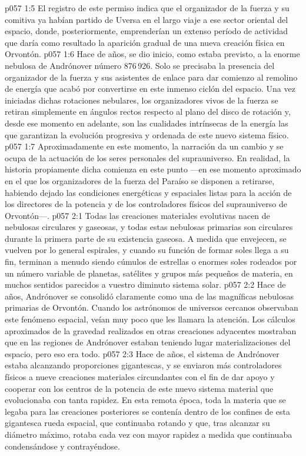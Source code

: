 \vs p057 1:5 El registro de este permiso indica que el organizador de la fuerza y su comitiva ya habían partido de Uversa en el largo viaje a ese sector oriental del espacio, donde, posteriormente, emprenderían un extenso período de actividad que daría como resultado la aparición gradual de una nueva creación física en Orvontón.
\vs p057 1:6 \pc Hace  de años, se dio inicio, como estaba previsto, a la enorme nebulosa de Andrónover número 876\,926. Solo se precisaba la presencia del organizador de la fuerza y sus asistentes de enlace para dar comienzo al remolino de energía que acabó por convertirse en este inmenso ciclón del espacio. Una vez iniciadas dichas rotaciones nebulares, los organizadores vivos de la fuerza se retiran simplemente en ángulos rectos respecto al plano del disco de rotación y, desde ese momento en adelante, son las cualidades intrínsecas de la energía las que garantizan la evolución progresiva y ordenada de este nuevo sistema físico.
\vs p057 1:7 Aproximadamente en este momento, la narración da un cambio y se ocupa de la actuación de los seres personales del suprauniverso. En realidad, la historia propiamente dicha comienza en este punto ---en ese momento aproximado en el que los organizadores de la fuerza del Paraíso se disponen a retirarse, habiendo dejado las condiciones energéticas y espaciales listas para la acción de los directores de la potencia y de los controladores físicos del suprauniverso de Orvontón---.
\vs p057 2:1 Todas las creaciones materiales evolutivas nacen de nebulosas circulares y gaseosas, y todas estas nebulosas primarias son circulares durante la primera parte de su existencia gaseosa. A medida que envejecen, se vuelven por lo general espirales, y cuando su función de formar soles llega a su fin, terminan a menudo siendo cúmulos de estrellas o enormes soles rodeados por un número variable de planetas, satélites y grupos más pequeños de materia, en muchos sentidos parecidos a vuestro diminuto sistema solar.
\vs p057 2:2 \pc Hace  de años, Andrónover se consolidó claramente como una de las magníficas nebulosas primarias de Orvontón. Cuando los astrónomos de universos cercanos observaban este fenómeno espacial, veían muy poco que les llamara la atención. Los cálculos aproximados de la gravedad realizados en otras creaciones adyacentes mostraban que en las regiones de Andrónover estaban teniendo lugar materializaciones del espacio, pero eso era todo.
\vs p057 2:3 \pc Hace  de años, el sistema de Andrónover estaba alcanzando proporciones gigantescas, y se enviaron más controladores físicos a nueve creaciones materiales circundantes con el fin de dar apoyo y cooperar con los centros de la potencia de este nuevo sistema material que evolucionaba con tanta rapidez. En esta remota época, toda la materia que se legaba para las creaciones posteriores se contenía dentro de los confines de esta gigantesca rueda espacial, que continuaba rotando y que, tras alcanzar su diámetro máximo, rotaba cada vez con mayor rapidez a medida que continuaba condensándose y contrayéndose.
